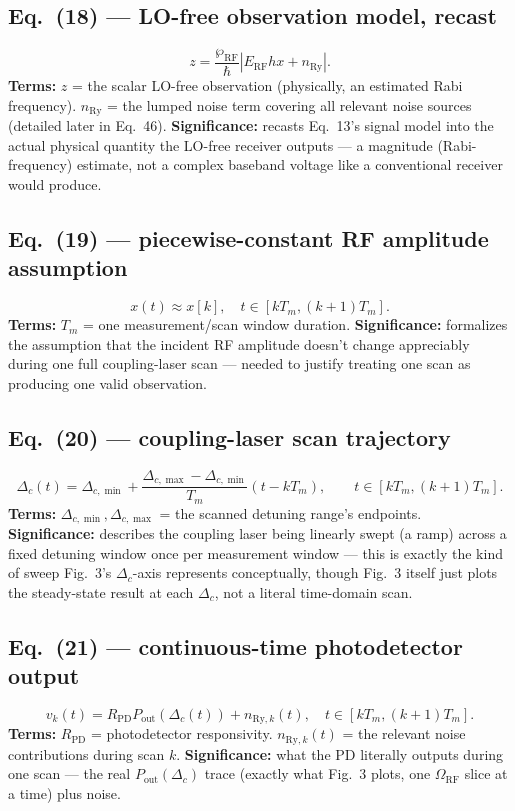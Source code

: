 \documentclass[11pt]{article}
\begin{document}
\subsection*{Eq.~(18) --- LO-free observation model, recast}
\begin{equation}
z = \frac{\wp_\text{RF}}{\hbar}\left|E_\text{RF}hx+n_\text{Ry}\right|. \tag{18}
\end{equation}
\textbf{Terms:} $z$ = the scalar LO-free observation (physically, an
estimated Rabi frequency). $n_\text{Ry}$ = the lumped noise term
covering all relevant noise sources (detailed later in Eq.~46).
\textbf{Significance:} recasts Eq.~13's signal model into the actual
physical quantity the LO-free receiver outputs --- a magnitude
(Rabi-frequency) estimate, not a complex baseband voltage like a
conventional receiver would produce.

\subsection*{Eq.~(19) --- piecewise-constant RF amplitude assumption}
\begin{equation}
x(t) \approx x[k],\quad t\in[kT_m,(k+1)T_m]. \tag{19}
\end{equation}
\textbf{Terms:} $T_m$ = one measurement/scan window duration.
\textbf{Significance:} formalizes the assumption that the incident RF
amplitude doesn't change appreciably during one full coupling-laser
scan --- needed to justify treating one scan as producing one valid
observation.

\subsection*{Eq.~(20) --- coupling-laser scan trajectory}
\begin{equation}
\Delta_c(t) = \Delta_{c,\min}+\frac{\Delta_{c,\max}-\Delta_{c,\min}}{T_m}(t-kT_m),\qquad t\in[kT_m,(k+1)T_m]. \tag{20}
\end{equation}
\textbf{Terms:} $\Delta_{c,\min},\Delta_{c,\max}$ = the scanned detuning
range's endpoints.
\textbf{Significance:} describes the coupling laser being linearly
swept (a ramp) across a fixed detuning window once per measurement
window --- this is exactly the kind of sweep Fig.~3's $\Delta_c$-axis
represents conceptually, though Fig.~3 itself just plots the
steady-state result at each $\Delta_c$, not a literal time-domain scan.

\subsection*{Eq.~(21) --- continuous-time photodetector output}
\begin{equation}
v_k(t) = R_\text{PD}P_\text{out}(\Delta_c(t))+n_{\text{Ry},k}(t),\quad t\in[kT_m,(k+1)T_m]. \tag{21}
\end{equation}
\textbf{Terms:} $R_\text{PD}$ = photodetector responsivity.
$n_{\text{Ry},k}(t)$ = the relevant noise contributions during scan $k$.
\textbf{Significance:} what the PD literally outputs during one scan
--- the real $P_\text{out}(\Delta_c)$ trace (exactly what Fig.~3 plots,
one $\Omega_\text{RF}$ slice at a time) plus noise.
\end{document}
